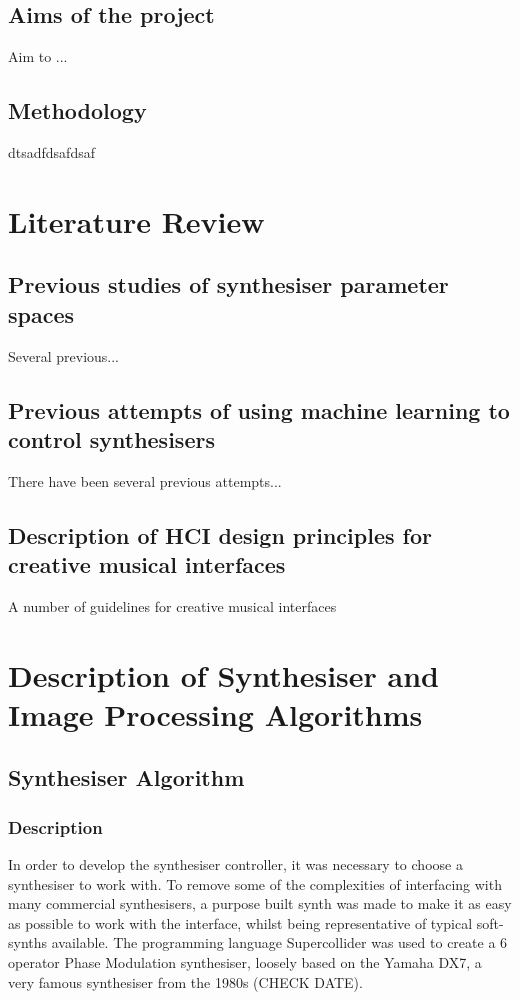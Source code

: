 \documentclass[11pt, oneside]{report}   	%
\begin{document}
\section{Aims of the project}
Aim to ...


\section{Methodology}
dtsadfdsafdsaf

\chapter{Literature Review}
\section{Previous studies of synthesiser parameter spaces}
Several previous...
\section{Previous attempts of using machine learning to control synthesisers}
There have been several previous attempts...
\section{Description of HCI design principles for creative musical interfaces}
A number of guidelines for creative musical interfaces

\chapter{Description of Synthesiser and Image Processing Algorithms}
\section{Synthesiser Algorithm}
\subsection{Description}
In order to develop the synthesiser controller, it was necessary to choose a synthesiser to work with. To remove some of the complexities of interfacing with many commercial synthesisers, a purpose built synth was made to make it as easy as possible to work with the interface, whilst being representative of typical soft-synths available.
The programming language Supercollider was used to create a 6 operator Phase Modulation synthesiser, loosely based on the Yamaha DX7, a very famous synthesiser from the 1980s (CHECK DATE).
 
\end{document}
